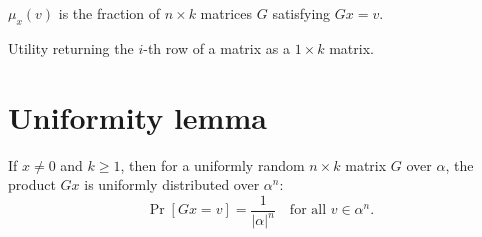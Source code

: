 \begin{definition}
\leanok
$\mu_x(v)$ is the fraction of $n\times k$ matrices $G$ satisfying $Gx=v$.
\end{definition}

\begin{definition}
\leanok
Utility returning the $i$-th row of a matrix as a $1\times k$ matrix.
\end{definition}

\section{Uniformity lemma}

\begin{theorem}
\leanok
{}
If $x\neq 0$ and $k\ge 1$, then for a uniformly random $n\times k$ matrix $G$ over $\alpha$,
the product $Gx$ is uniformly distributed over $\alpha^n$:
\[
\Pr[Gx = v] = \frac{1}{|\alpha|^n}
\quad\text{for all }v\in\alpha^n.
\]
\end{theorem}
